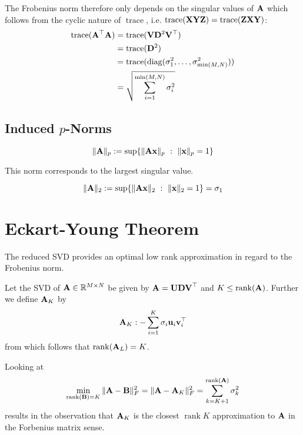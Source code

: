 The Frobenius norm therefore only depends on the singular values of \(\mathbf{A}\) which follows from the cyclic nature of \(\operatorname{trace}\), i.e. \(\operatorname{trace}(\mathbf{XYZ}) = \operatorname{trace}(\mathbf{ZXY})\):
\begin{align*}
\operatorname{trace}(\mathbf{A}^\top \mathbf{A}) &=
\operatorname{trace}(\mathbf{V} \mathbf{D}^2 \mathbf{V}^\top)\\
&= \operatorname{trace}(\mathbf{D}^2)\\
&= \operatorname{trace}(\operatorname{diag}(\sigma_1^2, \ldots, \sigma_{\min(M, N)}^2))\\
&= \sqrt{\sum_{i=1}^{\min(M,N)} \sigma_i^2}
\end{align*}

\subsection{Induced \(p\)-Norms}
\begin{definition}
\[
\| \mathbf{A} \|_p := \sup \{ \| \mathbf{Ax} \|_p \ : \ \| \mathbf{x} \|_p = 1 \}
\]
\end{definition}

\begin{definition}
This norm corresponds to the largest singular value.

\[
\| \mathbf{A} \|_2 := \sup \{ \| \mathbf{Ax} \|_2 \ : \ \| \mathbf{x} \|_2 = 1 \} = \sigma_1
\]
\end{definition}

\section{Eckart-Young Theorem}
The reduced SVD provides an optimal low rank approximation in regard to the Frobenius norm.

Let the SVD of \(\mathbf{A} \in \mathbb{R}^{M \times N}\) be given by \(\mathbf{A} = \mathbf{UDV}^\top\) and  \(K \leq \operatorname{rank}(\mathbf{A})\). Further we define \(\mathbf{A}_K\) by \[
\mathbf{A}_K :- \sum_{i=1}^K \sigma_i \mathbf{u}_i \mathbf{v}_i^\top
\]
from which follows that \(\operatorname{rank}(\mathbf{A}_L) = K\).

Looking at \[
\min_{\operatorname{rank}(\mathbf{B}) = K} \|\mathbf{A} - \mathbf{B}\|_F^2 = \|\mathbf{A} - \mathbf{A}_K\|_F^2 = \sum_{k = K+1}^{\operatorname{rank}(\mathbf{A})} \sigma_k^2
\]
results in the observation that \(\mathbf{A}_K\) is the closest \(\operatorname{rank} K\) approximation to \(\mathbf{A}\) in the Forbenius matrix sense.

